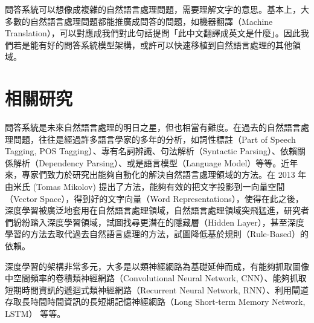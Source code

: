 問答系統可以想像成複雜的自然語言處理問題，需要理解文字的意思。基本上，大多數的自然語言處理問題都能推廣成問答的問題，如機器翻譯（Machine Translation），可以對應成我們對此句話提問「此中文翻譯成英文是什麼」。因此我們若是能有好的問答系統模型架構，或許可以快速移植到自然語言處理的其他領域。

\section{相關研究}%
問答系統是未來自然語言處理的明日之星，但也相當有難度。在過去的自然語言處理問題，往往是經過許多語言學家的多年的分析，如詞性標註（Part of Speech Tagging, POS Tagging）、專有名詞辨識、句法解析（Syntactic Parsing）、依賴關係解析（Dependency Parsing）、或是語言模型（Language Model）等等。近年來，專家們致力於研究出能夠自動化的解決自然語言處理領域的方法。在 2013 年由米氏 (Tomas Mikolov) 提出了方法，能夠有效的把文字投影到一向量空間（Vector Space），得到好的文字向量（Word Representations）\cite{mikolov2013efficient}，使得在此之後，深度學習被廣泛地套用在自然語言處理領域，自然語言處理領域突飛猛進，研究者們紛紛踏入深度學習領域，試圖找尋更潛在的隱藏層（Hidden Layer），甚至深度學習的方法去取代過去自然語言處理的方法，試圖降低基於規則（Rule-Based）的依賴。

深度學習的架構非常多元，大多是以類神經網路為基礎延伸而成，有能夠抓取圖像中空間頻率的卷積類神經網路（Convolutional Neural Network, CNN）\cite{lecun1995convolutional}\cite{jia2014caffe}、能夠抓取短期時間資訊的遞迴式類神經網路（Recurrent Neural Network, RNN）\cite{mikolov2010recurrent}、利用閘道存取長時間時間資訊的長短期記憶神經網路（Long Short-term Memory Network, LSTM）\cite{hochreiter1997long} 等等。

